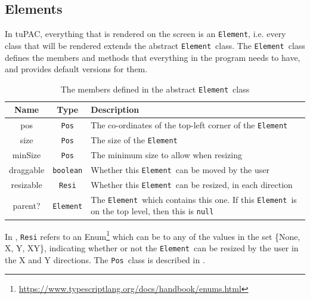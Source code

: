 \documentclass[12pt,a4paper,oneside,openright]{report}
\newcommand{\element}{\texttt{Element}}
\newcommand{\pos}{\texttt{Pos}}
\begin{document}
\subsection{Elements}
In tuPAC, everything that is rendered on the screen is an \element, i.e. every class that will be rendered extends the abstract \element\ class. The \element\ class defines the members and methods that everything in the program needs to have, and provides default versions for them.

\begin{table}[h]
    \centering
    \begin{tabular}{c|c|p{300pt}}
        Name & Type & Description \\
        \hline
        pos & \pos & The co-ordinates of the top-left corner of the \element\\
        size & \pos & The size of the \element\\
        minSize & \pos & The minimum size to allow when resizing\\
        draggable & \verb|boolean| & Whether this \element\ can be moved by the user\\ 
        resizable & \verb|Resi| & Whether this \element\ can be resized, in each direction\\
        parent? & \element & The \element\ which contains this one. If this \element\ is on the top level, then this is \verb|null|\\
    \end{tabular}
    \caption{The members defined in the abstract \element\ class}
    \label{tab:element_members}
\end{table}

In , \verb|Resi| refers to an Enum\footnote{\url{https://www.typescriptlang.org/docs/handbook/enums.html}} which can be to any of the values in the set \{None, X, Y, XY\}, indicating whether or not the \element\ can be resized by the user in the X and Y directions. The \pos\ class is described in .
\end{document}
